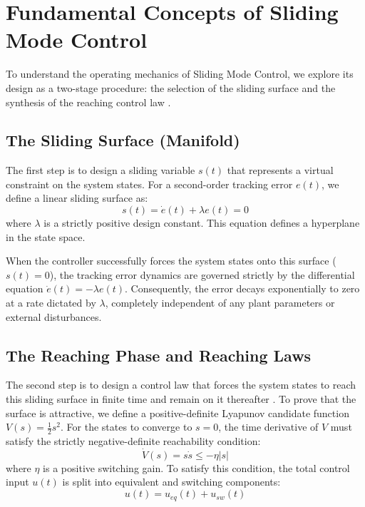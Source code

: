 \section{Fundamental Concepts of Sliding Mode Control}
To understand the operating mechanics of Sliding Mode Control, we explore its design as a two-stage procedure: the selection of the sliding surface and the synthesis of the reaching control law \cite{ref_65, ref_72}.

\subsection{The Sliding Surface (Manifold)}
The first step is to design a sliding variable $s(t)$ that represents a virtual constraint on the system states. For a second-order tracking error $e(t)$, we define a linear sliding surface as:
\begin{equation}
s(t) = \dot{e}(t) + \lambda e(t) = 0
\end{equation}
where $\lambda$ is a strictly positive design constant. This equation defines a hyperplane in the state space. 

When the controller successfully forces the system states onto this surface ($s(t) = 0$), the tracking error dynamics are governed strictly by the differential equation $\dot{e}(t) = -\lambda e(t)$. Consequently, the error decays exponentially to zero at a rate dictated by $\lambda$, completely independent of any plant parameters or external disturbances.

\subsection{The Reaching Phase and Reaching Laws}
The second step is to design a control law that forces the system states to reach this sliding surface in finite time and remain on it thereafter \cite{ref_65}. To prove that the surface is attractive, we define a positive-definite Lyapunov candidate function $V(s) = \frac{1}{2} s^2$. For the states to converge to $s = 0$, the time derivative of $V$ must satisfy the strictly negative-definite reachability condition:
\begin{equation}
\dot{V}(s) = s\dot{s} \leq -\eta |s|
\end{equation}
where $\eta$ is a positive switching gain. To satisfy this condition, the total control input $u(t)$ is split into equivalent and switching components:
\begin{equation}
u(t) = u_{eq}(t) + u_{sw}(t)
\end{equation}

